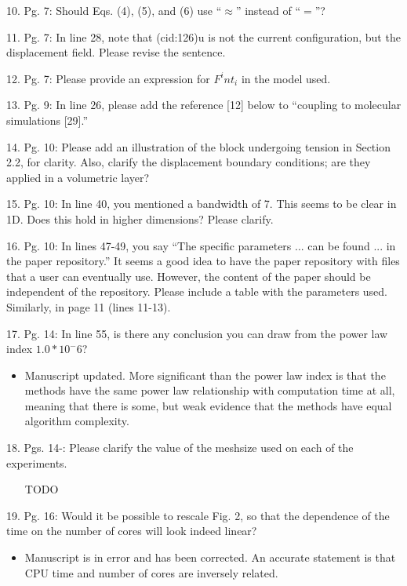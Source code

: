 \documentclass{article}
\begin{document}
\begin{enumerate}
10. Pg. 7: Should Eqs. (4), (5), and (6) use “$\approx$” instead of “$=$”?

11. Pg. 7: In line 28, note that (cid:126)u is not the current conﬁguration, but the displacement
ﬁeld. Please revise the sentence.

12. Pg. 7: Please provide an expression for ${F^int}_i$
in the model used.

13. Pg. 9: In line 26, please add the reference [12] below to “coupling to molecular
simulations [29].”

14. Pg. 10: Please add an illustration of the block undergoing tension in Section 2.2,
for clarity. Also, clarify the displacement boundary conditions; are they applied in a
volumetric layer?

15. Pg. 10: In line 40, you mentioned a bandwidth of 7. This seems to be clear in 1D.
Does this hold in higher dimensions? Please clarify.

16. Pg. 10: In lines 47-49, you say “The speciﬁc parameters ... can be found ... in the
paper repository.” It seems a good idea to have the paper repository with ﬁles that a
user can eventually use. However, the content of the paper should be independent
of the repository. Please include a table with the parameters used. Similarly, in
page 11 (lines 11-13).

17. Pg. 14: In line 55, is there any conclusion you can draw from the power law index
$1.0 * 10^-6$?
{\color{red}  
\begin{itemize}
     \item
      Manuscript updated. More significant than the power law index is that the methods have the same power law relationship with computation time at all, meaning that there is some, but weak evidence that the methods have equal algorithm complexity. 
  \end{itemize}}

18. Pgs. 14-: Please clarify the value of the meshsize used on each of the experiments.
{\color{red}  
\begin{itemize}
     \item
      [TODO]
  \end{itemize}}

19. Pg. 16: Would it be possible to rescale Fig. 2, so that the dependence of the time
on the number of cores will look indeed linear?
{\color{red}  
\begin{itemize}
     \item
     Manuscript is in error and has been corrected. An accurate statement is that CPU time and number of cores are inversely related.
  \end{itemize}}


\end{enumerate}
\end{document}

